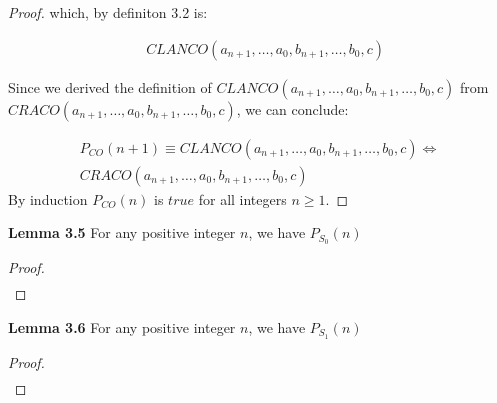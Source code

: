 \documentclass{article}
\begin{document}
\begin{proof}
	      which, by definiton 3.2 is:
	      
	      \begin{align*}
			& CLANCO(a_{n+1}, \ldots, a_0, b_{n+1}, \ldots, b_0, c) 
		\end{align*}
	 	
	 	Since we derived the definition of $CLANCO(a_{n+1}, \ldots, a_0, b_{n+1}, \ldots, b_0, c) $ from $CRACO(a_{n+1}, \ldots, a_0, b_{n+1}, \ldots, b_0, c)$, we can conclude:
	 	
		 \begin{align*}
	 		P_{CO}(n+1) \equiv CLANCO(a_{n+1}, \ldots, a_0, b_{n+1}, \ldots, b_0, c) \iff \\
	 		CRACO(a_{n+1}, \ldots, a_0, b_{n+1}, \ldots, b_0, c)
	 	\end{align*}
	 By induction $P_{CO}(n)$ is $true$ for all integers $n \geq 1$.
	
\end{proof}

\noindent \textbf{Lemma 3.5} For any positive integer $n$, we have $ P_{S_0}(n) $
\begin{proof}
	\begin{align*}
	\end{align*}
\end{proof}

\noindent \textbf{Lemma 3.6} For any positive integer $n$, we have $ P_{S_1}(n) $
\begin{proof}
	\begin{align*}
	\end{align*}
\end{proof}
\end{document}
